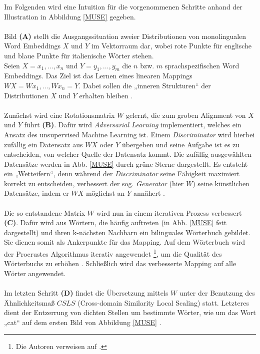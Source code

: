 \documentclass[ngerman]{ttlab-qualify}
\begin{document}
\noindent Im Folgenden wird eine Intuition für die vorgenommenen Schritte anhand der Illustration in Abbildung \ref{MUSE} gegeben.\\ 
\\
Bild \textbf{(A)} stellt die Ausgangssituation zweier Distributionen von monolingualen Word Embeddings $X$ und $Y$ im Vektorraum dar, wobei rote Punkte für englische und blaue Punkte für italienische Wörter stehen.\\
Seien \(X = x_1, \ldots, x_n\) und \(Y = y_1, \ldots, y_m\) die $n$ bzw. $m$ sprachspezifischen Word Embeddings.
Das Ziel ist das Lernen eines linearen Mappings \(WX = Wx_1, \ldots, Wx_n = Y\). Dabei sollen die „inneren Strukturen“ der Distributionen $X$ und $Y$ erhalten bleiben \parencite[3]{conneau2017word}.\\
\\
Zunächst wird eine Rotationsmatrix $W$ gelernt, die zum groben Alignment von $X$ und $Y$ führt \textbf{(B)}. Dafür wird \textit{Adversarial Learning} implementiert, welches ein Ansatz des unsupervised Machine Learning ist. Einem \textit{Discriminator} wird hierbei zufällig ein Datensatz aus \(WX\) oder $Y$ übergeben und seine Aufgabe ist es zu entscheiden, von welcher Quelle der Datensatz kommt. Die zufällig ausgewählten Datensätze werden in Abb. \ref{MUSE} durch grüne Sterne dargestellt. Es entsteht ein „Wetteifern“, denn während der \textit{Discriminator} seine Fähigkeit maximiert korrekt zu entscheiden, verbessert der sog. \textit{Generator} (hier $W$) seine künstlichen Datensätze, indem er \(WX\) möglichst an $Y$ annähert \parencite{conneau2017word}.\\
\\
Die so entstandene Matrix $W$ wird nun in einem iterativen Prozess verbessert \textbf{(C)}. Dafür wird aus Wörtern, die häufig auftreten (in Abb. \ref{MUSE} fett dargestellt) und ihren k-nächsten Nachbarn ein bilinguales Wörterbuch gebildet. Sie dienen somit als Ankerpunkte für das Mapping. Auf dem Wörterbuch wird der Procrustes Algorithmus iterativ angewendet \footnote{Die Autoren verweisen auf \textcite{artetxe-etal-2017-learning}.}, um die Qualität des Wörterbuchs zu erhöhen \parencite{conneau2017word}. Schließlich wird das verbesserte Mapping auf alle Wörter angewendet.\\
\\
Im letzten Schritt \textbf{(D)} findet die Übersetzung mittels $W$ unter der Benutzung des Ähnlichkeitsmaß $CSLS$ (Cross-domain Similarity Local Scaling) statt. Letzteres dient der Entzerrung von dichten Stellen um bestimmte Wörter, wie um das Wort „cat“ auf dem ersten Bild von Abbildung \ref{MUSE} \parencite{conneau2017word}.\\
\end{document}
